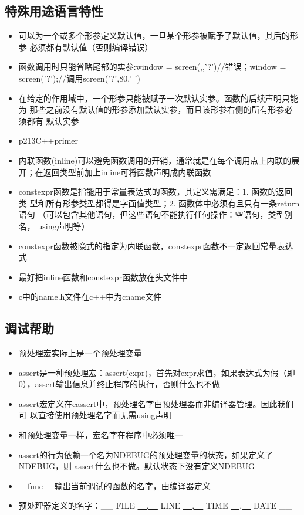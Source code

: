 \documentclass[11pt]{article}
\begin{document}
\subsection{特殊用途语言特性}
\label{sec-4-3}
\begin{itemize}
\item 可以为一个或多个形参定义默认值，一旦某个形参被赋予了默认值，其后的形参
必须都有默认值（否则编译错误）
\item 函数调用时只能省略尾部的实参:window = screen(,,'?')//错误；window =
screen('?');//调用screen('?',80,' ')
\item 在给定的作用域中，一个形参只能被赋予一次默认实参。函数的后续声明只能为
那些之前没有默认值的形参添加默认实参，而且该形参右侧的所有形参必须都有
默认实参
\item p213C++primer
\item 内联函数(inline)可以避免函数调用的开销，通常就是在每个调用点上内联的展
开；在返回类型前加上inline可将函数声明成内联函数
\item constexpr函数是指能用于常量表达式的函数，其定义需满足：1. 函数的返回类
型和所有形参类型都得是字面值类型；2. 函数体中必须有且只有一条return语句
（可以包含其他语句，但这些语句不能执行任何操作：空语句，类型别名，
using声明等）
\item constexpr函数被隐式的指定为内联函数，constexpr函数不一定返回常量表达式
\item 最好把inline函数和constexpr函数放在头文件中
\item c中的name.h文件在c++中为cname文件
\end{itemize}
\subsection{调试帮助}
\label{sec-4-4}
\begin{itemize}
\item 预处理宏实际上是一个预处理变量
\item assert是一种预处理宏：assert(expr)，首先对expr求值，如果表达式为假（即
0），assert输出信息并终止程序的执行，否则什么也不做
\item assert宏定义在cassert中，预处理名字由预处理器而非编译器管理。因此我们可
以直接使用预处理名字而无需using声明
\item 和预处理变量一样，宏名字在程序中必须唯一
\item assert的行为依赖一个名为NDEBUG的预处理变量的状态，如果定义了NDEBUG，则
assert什么也不做。默认状态下没有定义NDEBUG
\item \uline{\_ func \_} 输出当前调试的函数的名字，由编译器定义
\item 预处理器定义的名字：\_\_ FILE \uline{\_ , \_} LINE \uline{\_ , \_} TIME \uline{\_ , \_} DATE \_\_
\end{itemize}
\end{document}

